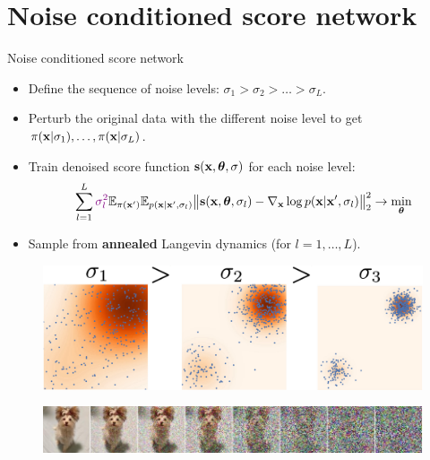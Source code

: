 \section{Noise conditioned score network}
\begin{frame}{Noise conditioned score network}
	\begin{itemize}
		\item Define the sequence of noise levels: $\sigma_1 > \sigma_2 > \dots > \sigma_L$.
		\item Perturb the original data with the different noise level to get $\pi(\mathbf{x} | \sigma_1), \dots, \pi(\mathbf{x} | \sigma_L)$.
		\item Train denoised score function $\mathbf{s}(\mathbf{x}, \boldsymbol{\theta}, \sigma)$ for each noise level:
		\vspace{-0.2cm}
		\[
			\sum_{l=1}^L {\color{violet}\sigma_l^2} \mathbb{E}_{\pi(\mathbf{x}')} \mathbb{E}_{p(\mathbf{x} | \mathbf{x}', \sigma_l)}\bigl\| \mathbf{s}(\mathbf{x}, \boldsymbol{\theta}, \sigma_l) - \nabla_{\mathbf{x}} \log p(\mathbf{x} | \mathbf{x}', \sigma_l) \bigr\|^2_2 \rightarrow \min_{\boldsymbol{\theta}}
		\]
		\item Sample from \textbf{annealed} Langevin dynamics (for $l=1, \dots, L$).
	\end{itemize}
	\begin{figure}
		\includegraphics[width=0.6\linewidth]{figs/multi_scale}
	\end{figure}
	\begin{figure}
		\includegraphics[width=\linewidth]{figs/duoduo}
	\end{figure}
\end{frame}
